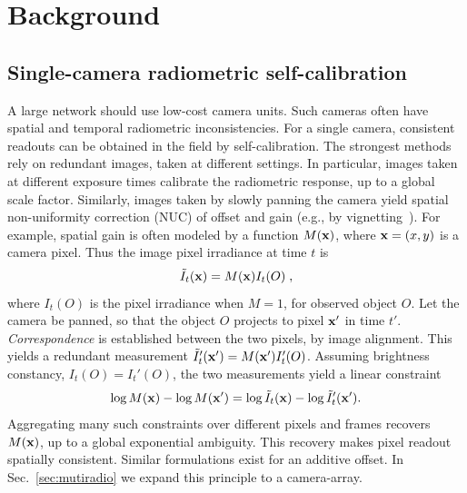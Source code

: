 \documentclass[runningheads]{llncs}
\begin{document}
\section{Background}
\label{sec:theory}



\subsection{Single-camera radiometric self-calibration}
\label{sec:Signelradio}

A large network should use low-cost camera units. Such cameras often have spatial and temporal radiometric inconsistencies. For a single camera, consistent readouts can be obtained in the field by self-calibration. The strongest methods rely on redundant images, taken at different settings. In particular, images taken at different exposure times calibrate the radiometric response, up to a global scale factor. Similarly, images taken by slowly panning the camera yield spatial non-uniformity correction (NUC) of offset and gain (e.g., by vignetting~\cite{LitvinovCVPR05,Kang2000}). For example, spatial gain is often modeled by a function $M({\bf x})$, where \mbox{${\bf x}=(x,y)$} is a camera pixel. Thus the image pixel irradiance at time $t$ is
\begin{equation}
 \tilde{I}_t({\bf x}) = M({\bf x})I_t(O) \;,
 \label{eq:tilde_I}
\end{equation}
where $I_t(O)$ is the pixel irradiance when $M=1$, for observed object $O$. Let the camera be panned, so that the object $O$ projects to pixel ${\bf x}'$ in time $t'$.
{\em Correspondence} is established between the two pixels, by image alignment. This yields a redundant measurement $\tilde{I}_t'({\bf x}') = M({\bf x}')I_t'(O)$. Assuming brightness constancy, $I_t(O)=I_t'(O)$, the two measurements yield a linear constraint
\begin{equation}
 \log M({\bf x})- \log M({\bf x}')=\log \tilde{I}_t({\bf x})-\log \tilde{I}_t'({\bf x}').
 \label{eq:logM}
\end{equation}
Aggregating many such constraints over different pixels and frames recovers $M({\bf x})$, up to a global exponential ambiguity. This recovery makes pixel readout spatially consistent. Similar formulations exist for an additive offset. In Sec.~\ref{sec:mutiradio} we expand this principle to a camera-array.
\end{document}
